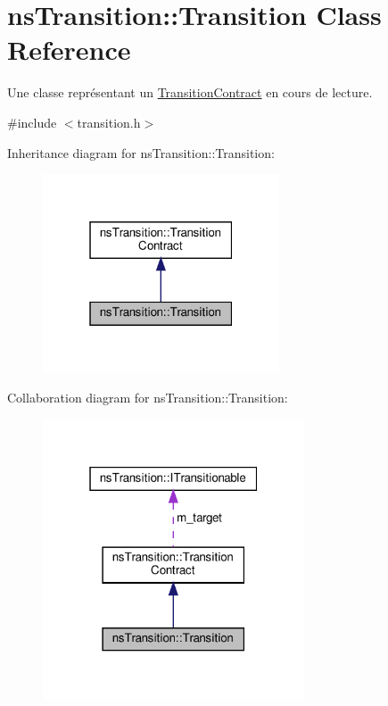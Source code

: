 \hypertarget{classns_transition_1_1_transition}{}\section{ns\+Transition\+:\+:Transition Class Reference}
\label{classns_transition_1_1_transition}


Une classe représentant un \hyperlink{classns_transition_1_1_transition_contract}{Transition\+Contract} en cours de lecture.  




{\ttfamily \#include $<$transition.\+h$>$}



Inheritance diagram for ns\+Transition\+:\+:Transition\+:
\nopagebreak
\begin{figure}[H]
\begin{center}
\leavevmode
\includegraphics[width=199pt]{classns_transition_1_1_transition__inherit__graph}
\end{center}
\end{figure}


Collaboration diagram for ns\+Transition\+:\+:Transition\+:
\nopagebreak
\begin{figure}[H]
\begin{center}
\leavevmode
\includegraphics[width=220pt]{classns_transition_1_1_transition__coll__graph}
\end{center}
\end{figure}
